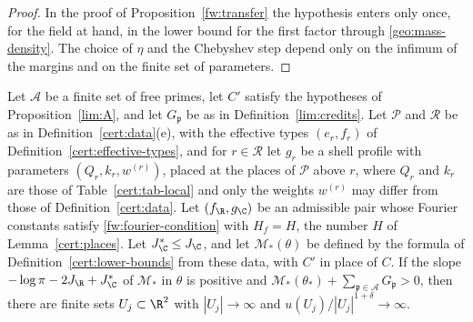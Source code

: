 \begin{proof}
In the proof of Proposition~\ref{fw:transfer} the hypothesis enters only once,
for the field at hand, in the lower bound for the first factor through
\eqref{geo:mass-density}. The choice of $\eta$ and the Chebyshev step depend
only on the infimum of the margins and on the finite set of parameters.
\end{proof}

\begin{proposition}\label{lim:B}
Let $\mathcal A$ be a finite set of free primes, let $C'$ satisfy the
hypotheses of Proposition~\ref{lim:A}, and let $G_{\mathfrak p}$ be as in
Definition~\ref{lim:credits}. Let $\mathcal P$ and $\mathcal R$ be as
in Definition~\ref{cert:data}(e), with the effective types $(e_r,f_r)$ of
Definition~\ref{cert:effective-types}, and for $r\in\mathcal R$ let $g_r$ be a
shell profile with parameters $(Q_r,k_r,w^{(r)})$, placed at the places of
$\mathcal P$ above $r$, where $Q_r$ and $k_r$ are those of
Table~\ref{cert:tab-local} and only the weights $w^{(r)}$ may differ from those
of Definition~\ref{cert:data}. Let $(f_\R,g_\C)$ be an admissible pair whose Fourier
constants satisfy \eqref{fw:fourier-condition} with $H_f=H$, the number $H$ of
Lemma~\ref{cert:places}. Let $J_\C^*\le J_\C$, and let $\mathcal M_*(\theta)$
be defined by the formula of Definition~\ref{cert:lower-bounds} from these
data, with $C'$ in place of $C$. If the slope $-\log\pi-2J_\R+J_\C^*$ of
$\mathcal M_*$ in $\theta$ is positive and
$\mathcal M_*(\theta_*)+\sum_{\mathfrak p\in\mathcal A}G_{\mathfrak p}>0$, then
there are finite sets $U_j\subset\R^2$ with $|U_j|\to\infty$ and
$u(U_j)/|U_j|^{1+\delta}\to\infty$.
\end{proposition}

